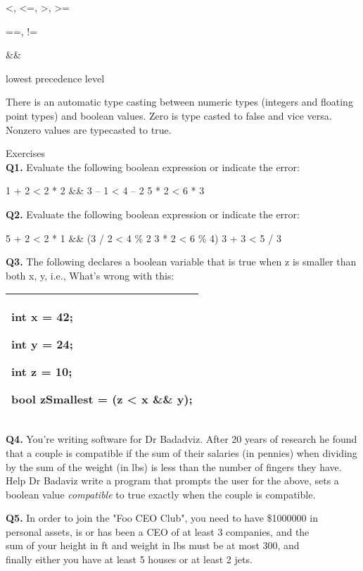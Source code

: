 \documentclass[
]{article}
\begin{document}
\textless, \textless=, \textgreater, \textgreater=

==, !=

\&\&

\textbar\textbar lowest precedence level

There is an automatic type casting between numeric types (integers and
floating point types) and boolean values. Zero is type casted to false
and vice versa. Nonzero values are typecasted to true.

Exercises\\

\textbf{Q1.} Evaluate the following boolean expression or indicate the
error:

1 + 2 \textless{} 2 * 2 \&\& 3 -- 1 \textless{} 4 -- 2
\textbar\textbar{} 5 * 2 \textless{} 6 * 3

\textbf{Q2.} Evaluate the following boolean expression or indicate the
error:

5 + 2 \textless{} 2 * 1 \&\& (3 / 2 \textless{} 4 \% 2
\textbar\textbar{} 3 * 2 \textless{} 6 \% 4) \textbar\textbar{} 3 + 3
\textless{} 5 / 3

\textbf{Q3.} The following declares a boolean variable that is true when
z is smaller than both x, y, i.e., What's wrong with this:

\begin{longtable}[]{@{}l@{}}
\toprule
\endhead
\begin{minipage}[t]{0.97\columnwidth}\raggedright
int x = 42;

int y = 24;

int z = 10;

bool zSmallest = (z \textless{} x \&\& y);\strut
\end{minipage}\tabularnewline
\bottomrule
\end{longtable}

\textbf{Q4.} You're writing software for Dr Badadviz. After 20 years of
research he found that a couple is compatible if the sum of their
salaries (in pennies) when dividing by the sum of the weight (in lbs) is
less than the number of fingers they have. Help Dr Badaviz write a
program that prompts the user for the above, sets a boolean value
\emph{compatible} to true exactly when the couple is compatible.

\textbf{Q5.} In order to join the "Foo CEO Club", you need to have
\$1000000 in\\
personal assets, is or has been a CEO of at least 3 companies, and the\\
sum of your height in ft and weight in lbs must be at most 300, and\\
finally either you have at least 5 houses or at least 2 jets.
\end{document}
